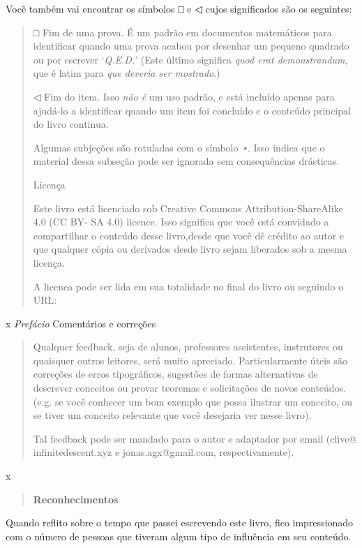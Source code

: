 \documentclass[
]{article}
\begin{document}
Você também vai encontrar os símbolos □ e ◁ cujos significados são os
seguintes:

\begin{quote}
□ Fim de uma prova. É um padrão em documentos matemáticos para
identificar quando uma prova acabou por desenhar um pequeno quadrado ou
por escrever `\emph{Q.E.D.}' (Este último significa \emph{quod erat
demonstrandum}, que é latim para \emph{que deveria ser mostrado}.)

◁ Fim do item. Isso \emph{não é} um uso padrão, e está incluído apenas
para ajudá-lo a identificar quando um item foi concluído e o conteúdo
principal do livro continua.

Algumas subjeções são rotuladas com o símbolo \emph{⋆}. Isso indica que
o material dessa subseção pode ser ignorada sem consequências drásticas.

Licença

Este livro está licenciado sob Creative Commons Attribution-ShareAlike
4.0 (CC BY- SA 4.0) licence. Isso significa que você está convidado a
compartilhar o conteúdo desse livro,desde que você dê crédito ao autor e
que qualquer cópia ou derivados desde livro sejam liberados sob a mesma
licença.

A licenca pode ser lida em sua totalidade no final do livro ou seguindo
o URL:
\end{quote}

x \emph{Prefácio} Comentários e correções

\begin{quote}
Qualquer feedback, seja de alunos, professores assistentes, instrutores
ou quaisquer outros leitores, será muito apreciado. Particularmente
úteis são correções de erros tipográficos, sugestões de formas
alternativas de descrever conceitos ou provar teoremas e solicitações de
novos conteúdos. (e.g. se você conhecer um bom exemplo que possa
ilustrar um conceito, ou se tiver um conceito relevante que você
desejaria ver nesse livro).

Tal feedback pode ser mandado para o autor e adaptador por email (clive@
infinitedescent.xyz e jonas.agx@gmail.com, respectivamente).
\end{quote}

x

\begin{quote}
\textbf{Reconhecimentos}
\end{quote}

Quando reflito sobre o tempo que passei escrevendo este livro, fico
impressionado com o número de pessoas que tiveram algum tipo de
influência em seu conteúdo.
\end{document}
